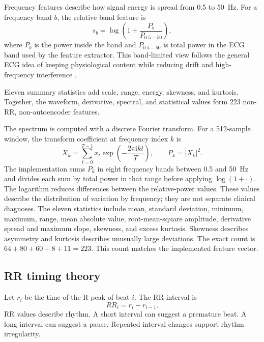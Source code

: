 Frequency features describe how signal energy is spread from 0.5 to 50~Hz. For
a frequency band $b$, the relative band feature is
\begin{equation}
 s_b=\log\left(1+\frac{P_b}{P_{0.5-50}}\right),
\end{equation}
where $P_b$ is the power inside the band and $P_{0.5-50}$ is total power in the
ECG band used by the feature extractor. This band-limited view follows the
general ECG idea of keeping physiological content while reducing drift and
high-frequency interference
\cite{kligfield2007standardization,butterworth1930filter}.

Eleven summary statistics add scale, range, energy, skewness, and kurtosis.
Together, the waveform, derivative, spectral, and statistical values form 223
non-RR, non-autoencoder features.

The spectrum is computed with a discrete Fourier transform. For a 512-sample
window, the transform coefficient at frequency index $k$ is
\begin{equation}
 X_k=\sum_{t=0}^{T-1}x_t\exp\!\left(-\frac{2\pi\mathrm{i}kt}{T}\right),
 \qquad P_k=|X_k|^2.
 \label{eq:theory-dft}
\end{equation}
The implementation sums $P_k$ in eight frequency bands between 0.5 and
50~Hz and divides each sum by total power in that range before applying
$\log(1+\cdot)$. The logarithm reduces differences between the relative-power values. These values describe
the distribution of variation by frequency; they are not separate clinical
diagnoses. The eleven statistics include mean, standard deviation, minimum,
maximum, range, mean absolute value, root-mean-square amplitude, derivative
spread and maximum slope, skewness, and excess kurtosis. Skewness describes
asymmetry and kurtosis describes unusually large deviations. The exact count
is $64+80+60+8+11=223$. This count matches the implemented feature vector.

\subsection{RR timing theory}

Let $r_i$ be the time of the R peak of beat $i$. The RR interval is
\begin{equation}
 RR_i=r_i-r_{i-1}.
\end{equation}
RR values describe rhythm. A short interval can suggest a premature beat. A
long interval can suggest a pause. Repeated interval changes support rhythm
irregularity.

